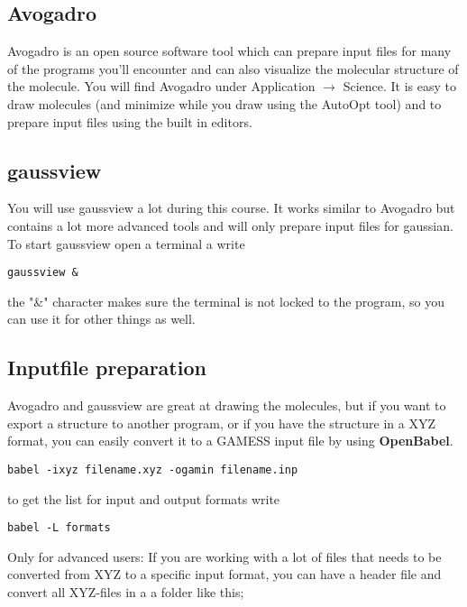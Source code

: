\documentclass{article}
\begin{document}
\subsection*{Avogadro}

Avogadro is an open source software tool which can prepare input files for many of the programs you'll encounter and can also visualize the molecular structure of the molecule.
You will find Avogadro under Application $\rightarrow$ Science.
It is easy to draw molecules (and minimize while you draw using the AutoOpt tool) and to prepare input files using the built in editors.

\subsection*{gaussview}

You will use gaussview a lot during this course.
It works similar to Avogadro but contains a lot more advanced tools and will only prepare input files for gaussian.
To start gaussview open a terminal a write
\begin{lstlisting}
gaussview &
\end{lstlisting}

the "\&" character makes sure the terminal is not locked to the program, so you can use it for other things as well.


\subsection*{Inputfile preparation}

Avogadro and gaussview are great at drawing the molecules, but if you want to export a structure to another program, or if you have the structure in a XYZ format, you can easily convert it to a GAMESS input file by using {\bf OpenBabel}.

\begin{lstlisting}
babel -ixyz filename.xyz -ogamin filename.inp
\end{lstlisting}

to get the list for input and output formats write

\begin{lstlisting}
babel -L formats
\end{lstlisting}

Only for advanced users: If you are working with a lot of files that needs to be converted from XYZ to a specific input format, you can have a header file  and convert all XYZ-files in a a folder like this;
\end{document}
